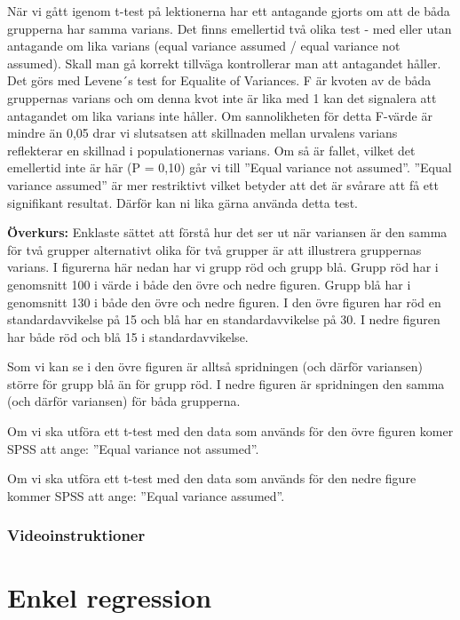 \documentclass[
]{book}
\begin{document}
När vi gått igenom t-test på lektionerna har ett antagande gjorts om att de båda grupperna har samma
varians. Det finns emellertid två olika test - med eller utan antagande om lika varians (equal variance
assumed / equal variance not assumed). Skall man gå korrekt tillväga kontrollerar man att antagandet
håller. Det görs med Levene´s test for Equalite of Variances. F är kvoten av de båda gruppernas varians
och om denna kvot inte är lika med 1 kan det signalera att antagandet om lika varians inte håller. Om
sannolikheten för detta F-värde är mindre än 0,05 drar vi slutsatsen att skillnaden mellan urvalens
varians reflekterar en skillnad i populationernas varians. Om så är fallet, vilket det emellertid inte är här (P = 0,10) går vi till ''Equal variance not assumed''. ''Equal variance assumed'' är mer restriktivt vilket
betyder att det är svårare att få ett signifikant resultat. Därför kan ni lika gärna använda detta test.

\textbf{Överkurs:} Enklaste sättet att förstå hur det ser ut när variansen är den samma för två grupper alternativt olika för två grupper är att illustrera gruppernas varians. I figurerna här nedan har vi grupp röd och grupp blå. Grupp röd har i genomsnitt 100 i värde i både den övre och nedre figuren. Grupp blå har i genomsnitt 130 i både den övre och nedre figuren. I den övre figuren har röd en standardavvikelse på 15 och blå har en standardavvikelse på 30. I nedre figuren har både röd och blå 15 i standardavvikelse.

Som vi kan se i den övre figuren är alltså spridningen (och därför variansen) större för grupp blå än för grupp röd. I nedre figuren är spridningen den samma (och därför variansen) för båda grupperna.

Om vi ska utföra ett t-test med den data som används för den övre figuren komer SPSS att ange: ''Equal variance not assumed''.

Om vi ska utföra ett t-test med den data som används för den nedre figure kommer SPSS att ange: ''Equal variance assumed''.

\hypertarget{videoinstruktioner-8}{%
\subsection{Videoinstruktioner}\label{videoinstruktioner-8}}

\hypertarget{enkel-regression}{%
\chapter{Enkel regression}\label{enkel-regression}}
\end{document}
